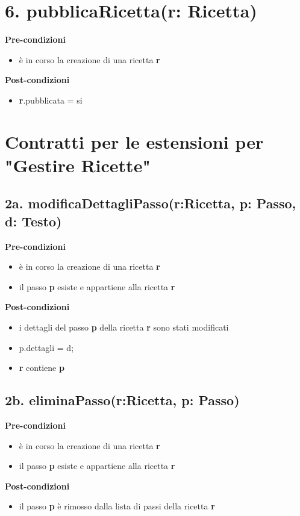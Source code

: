 \documentclass[12pt]{extarticle}
\begin{document}
\section*{6. pubblicaRicetta(r: Ricetta)}

\textbf{Pre-condizioni}
\begin{itemize}
  \item è in corso la creazione di una ricetta  \textbf{r}
\end{itemize}
\textbf{Post-condizioni}
\begin{itemize}
  \item \textbf{r}.pubblicata = si
\end{itemize}

\section*{Contratti per le estensioni per "Gestire Ricette"}

\subsection*{2a. modificaDettagliPasso(r:Ricetta, p: Passo, d: Testo)}

\textbf{Pre-condizioni}
\begin{itemize}
  \item è in corso la creazione di una ricetta  \textbf{r}
  \item il passo  \textbf{p} esiste e appartiene alla ricetta \textbf{r}
\end{itemize}
\textbf{Post-condizioni}
\begin{itemize}
  \item i dettagli del passo \textbf{p} della ricetta \textbf{r} sono stati modificati
  \item p.dettagli = d;
  \item  \textbf{r} contiene  \textbf{p}
\end{itemize}

\subsection*{2b. eliminaPasso(r:Ricetta, p: Passo)}

\textbf{Pre-condizioni}
\begin{itemize}
  \item è in corso la creazione di una ricetta  \textbf{r}
  \item il passo  \textbf{p} esiste e appartiene alla ricetta \textbf{r}
\end{itemize}
\textbf{Post-condizioni}
\begin{itemize}
  \item il passo  \textbf{p} è rimosso dalla lista di passi della ricetta \textbf{r}
\end{itemize}
\end{document}
